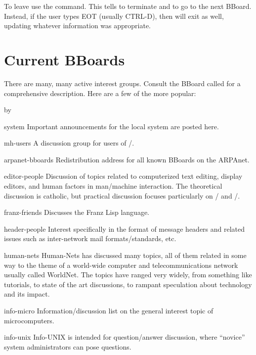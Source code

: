 To leave  use the  command.
This tells  to terminate and  to go to the next BBoard.
Instead, if the user types EOT (usually CTRL-D),
then  will exit as well,
updating whatever information was appropriate.

\section{Current BBoards}
There are many, many active interest groups.
Consult the BBoard called  for a comprehensive description.
Here are a few of the more popular:
\smallskip
{\advance\leftskip by\parindent
\item{\tx system}
Important announcements for the local system are posted here.

\item{\tx mh-users}
A discussion group for users of \MH/.

\item{\tx arpanet-bboards}
Redistribution address for all known BBoards on the ARPAnet.

\item{\tx editor-people}
Discussion of topics related to computerized text editing, display editors, 
and human factors in man/machine interaction.
The theoretical discussion is catholic,
but practical discussion focuses particularly on / and \unix/.

\item{\tx franz-friends}
Discusses the Franz Lisp language.

\item{\tx header-people}
Interest specifically in the format of message headers and related issues 
such as inter-network mail formats/standards, etc.

\item{\tx human-nets}
{\sf Human-Nets} has discussed many topics,
all of them related in some way to the theme of a world-wide computer and
telecommunications network usually called WorldNet.
The topics have ranged very widely, from something like tutorials,
to state of the art discussions,
to rampant speculation about technology and its impact.

\item{\tx info-micro}
Information/discussion list on the general interest topic of microcomputers.

\item{\tx info-unix}
{\sf Info-UNIX} is intended for question/answer discussion,
where ``novice'' system administrators can pose questions.

}
